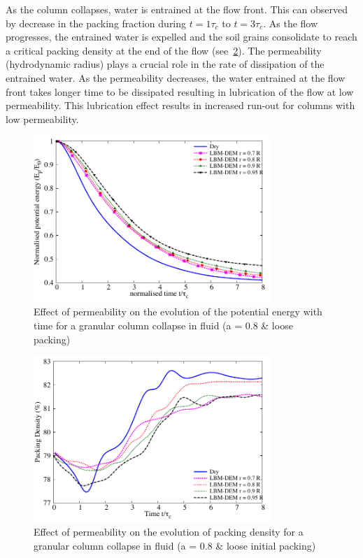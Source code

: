 As the column collapses, water is entrained at the flow front. This can 
observed by decrease in the packing fraction during $t = 1\tau_c$ to $t = 
3\tau_c$. As the flow progresses, the entrained water is expelled and the soil 
grains consolidate to reach a critical packing density at the end of the flow 
(see~\cref{fig:Packing_Density_a08_loose}). The permeability (hydrodynamic 
radius) plays a crucial role in the rate of dissipation of the entrained water. 
As the permeability decreases, the water entrained at the flow front takes 
longer time to be dissipated resulting in lubrication of the flow at low 
permeability. This lubrication effect results in increased run-out for columns 
with low permeability.

\begin{figure}
	\centering
    \includegraphics[width=0.8\textwidth]{PE_a08_loose}
    \caption{Effect of permeability on the evolution of the potential energy 
    with time for a granular column collapse in fluid (a = 0.8 \& loose 
    packing)}
    \label{fig:PE_a08_loose}
\end{figure}


\begin{figure}
	\centering
    \includegraphics[width=0.8\textwidth]{Packing_Density_a08_loose}
    \caption{Effect of permeability on the evolution of packing density for a 
    granular column collapse in fluid (a = 0.8 \& loose initial packing)}
    \label{fig:Packing_Density_a08_loose}
\end{figure}

